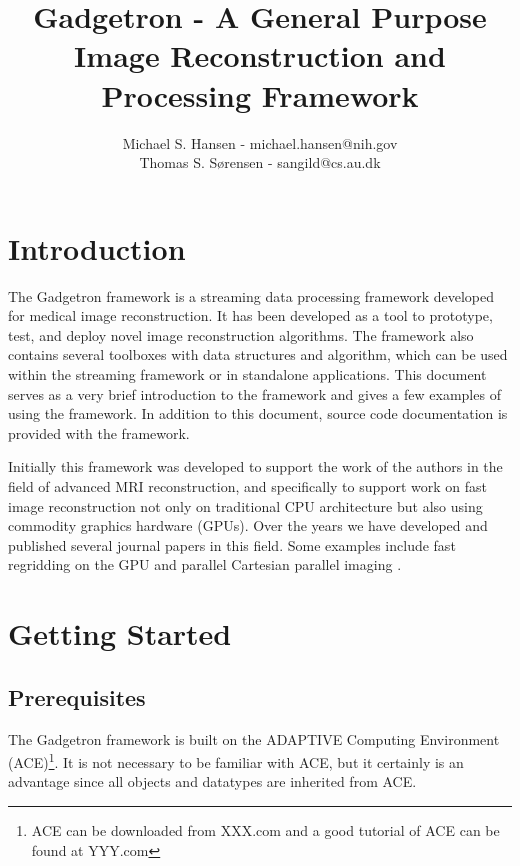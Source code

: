 \documentclass[11pt]{article}
\title{Gadgetron - A General Purpose Image Reconstruction and Processing Framework}
\author{Michael S. Hansen - michael.hansen@nih.gov \\ Thomas S. S{\o}rensen - sangild@cs.au.dk}
\date{}
\begin{document}
\maketitle
\tableofcontents

\section{Introduction}
The Gadgetron framework is a streaming data processing framework developed for medical image reconstruction. It has been developed as a tool to prototype, test, and deploy novel image reconstruction algorithms. The framework also contains several toolboxes with data structures and algorithm, which can be used within the streaming framework or in standalone applications. This document serves as a very brief introduction to the framework and gives a few examples of using the framework. In addition to this document, source code documentation is provided with the framework.

Initially this framework was developed to support the work of the authors in the field of advanced MRI reconstruction, and specifically to support work on fast image reconstruction not only on traditional CPU architecture but also using commodity graphics hardware (GPUs). Over the years we have developed and published several journal papers in this field. Some examples include fast regridding on the GPU  \cite{sorensen_accelerating_2008} and parallel Cartesian parallel imaging \cite{hansen_cartesian_2008}. 


\section{Getting Started}
\subsection{Prerequisites}
The Gadgetron framework is built on the ADAPTIVE Computing Environment (ACE)\footnote{ACE can be downloaded from XXX.com and a good tutorial of ACE can be found at YYY.com}. It is not necessary to be familiar with ACE, but it certainly is an advantage since all objects and datatypes are inherited from ACE. 
\end{document}
